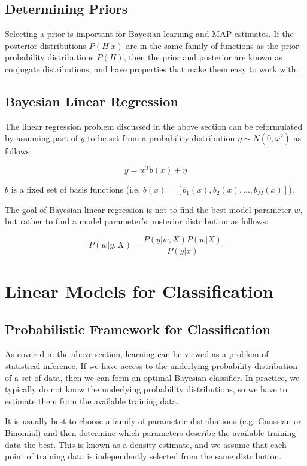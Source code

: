 \documentclass[12pt,titlepage]{article}
\let\stdsection\section
\renewcommand\section{\clearpage\stdsection}
\begin{document}
    \subsection{Determining Priors}
      Selecting a prior is important for Bayesian learning and MAP estimates. If the posterior distributions $P(H|x)$ are in the same family of functions as
      the prior probability distributions $P(H)$, then the prior and posterior are known as conjugate distributions, and have properties that make them easy
      to work with.

    \subsection{Bayesian Linear Regression}
      The linear regression problem discussed in the above section can be reformulated by assuming part of $y$ to be set from a probability distribution
      $\eta \sim N(0, \omega^2)$ as follows:

      $$y = w^Tb(x) + \eta$$

      $b$ is a fixed set of basis functions (i.e. $b(x) = [b_1(x), b_2(x), . . ., b_M(x)]$).

      The goal of Bayesian linear regression is not to find the best model parameter $w$, but rather to find a model parameter's posterior distribution
      as follows:

      $$P(w|y,X) = \frac{P(y|w,X)P(w|X)}{P(y|x)}$$

  \section{Linear Models for Classification}

    \subsection{Probabilistic Framework for Classification}
      As covered in the above section, learning can be viewed as a problem of statistical inference. If we have access to the underlying probability
      distribution of a set of data, then we can form an optimal Bayesian classifier. In practice, we typically do not know the underlying probability
      distributions, so we have to estimate them from the available training data.

      It is usually best to choose a family of parametric distributions (e.g. Gaussian or Binomial) and then determine which parameters describe the
      available training data the best. This is known as a density estimate, and we assume that each point of training data is independently selected
      from the same distribution.
\end{document}

